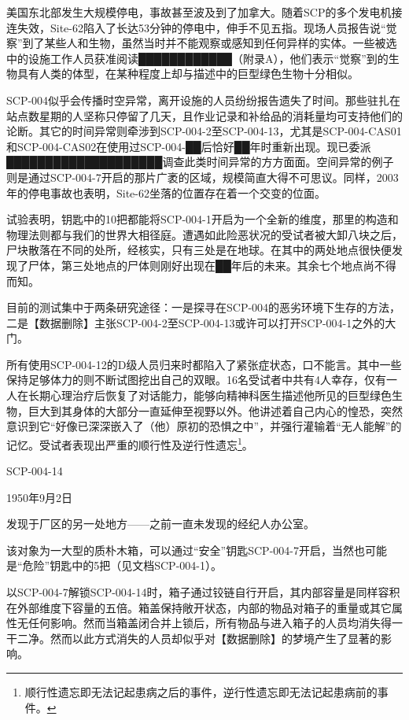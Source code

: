 美国东北部发生大规模停电，事故甚至波及到了加拿大。随着SCP的多个发电机接连失效，Site-62陷入了长达53分钟的停电中，伸手不见五指。现场人员报告说“觉察”到了某些人和生物，虽然当时并不能观察或感知到任何异样的实体。一些被选中的设施工作人员获准阅读████████████（附录A），他们表示“觉察”到的生物具有人类的体型，在某种程度上却与描述中的巨型绿色生物十分相似。


SCP-004似乎会传播时空异常，离开设施的人员纷纷报告遗失了时间。那些驻扎在站点数星期的人坚称只停留了几天，且作业记录和补给品的消耗量均可支持他们的论断。其它的时间异常则牵涉到SCP-004-2至SCP-004-13，尤其是SCP-004-CAS01和SCP-004-CAS02在使用过SCP-004-██后恰好██年时重新出现。现已委派████████████████████调查此类时间异常的方方面面。空间异常的例子则是通过SCP-004-7开启的那片广袤的区域，规模简直大得不可思议。同样，2003年的停电事故也表明，Site-62坐落的位置存在着一个交变的位面。


试验表明，钥匙中的10把都能将SCP-004-1开启为一个全新的维度，那里的构造和物理法则都与我们的世界大相径庭。遭遇如此险恶状况的受试者被大卸八块之后，尸块散落在不同的处所，经核实，只有三处是在地球。在其中的两处地点很快便发现了尸体，第三处地点的尸体则刚好出现在██年后的未来。其余七个地点尚不得而知。

目前的测试集中于两条研究途径：一是探寻在SCP-004的恶劣环境下生存的方法，二是【数据删除】主张SCP-004-2至SCP-004-13或许可以打开SCP-004-1之外的大门。


所有使用SCP-004-12的D级人员归来时都陷入了紧张症状态，口不能言。其中一些保持足够体力的则不断试图挖出自己的双眼。16名受试者中共有4人幸存，仅有一人在长期心理治疗后恢复了对话能力，能够向精神科医生描述他所见的巨型绿色生物，巨大到其身体的大部分一直延伸至视野以外。他讲述着自己内心的惶恐，突然意识到它“好像已深深嵌入了（他）原初的恐惧之中”，并强行灌输着“无人能解”的记忆。受试者表现出严重的顺行性及逆行性遗忘\footnote{顺行性遗忘即无法记起患病之后的事件，逆行性遗忘即无法记起患病前的事件。}。


SCP-004-14

1950年9月2日

发现于厂区的另一处地方——之前一直未发现的经纪人办公室。

该对象为一大型的质朴木箱，可以通过“安全”钥匙SCP-004-7开启，当然也可能是“危险”钥匙中的5把（见文档SCP-004-1）。

以SCP-004-7解锁SCP-004-14时，箱子通过铰链自行开启，其内部容量是同样容积在外部维度下容量的五倍。箱盖保持敞开状态，内部的物品对箱子的重量或其它属性无任何影响。然而当箱盖闭合并上锁后，所有物品与进入箱子的人员均消失得一干二净。然而以此方式消失的人员却似乎对【数据删除】的梦境产生了显著的影响。
